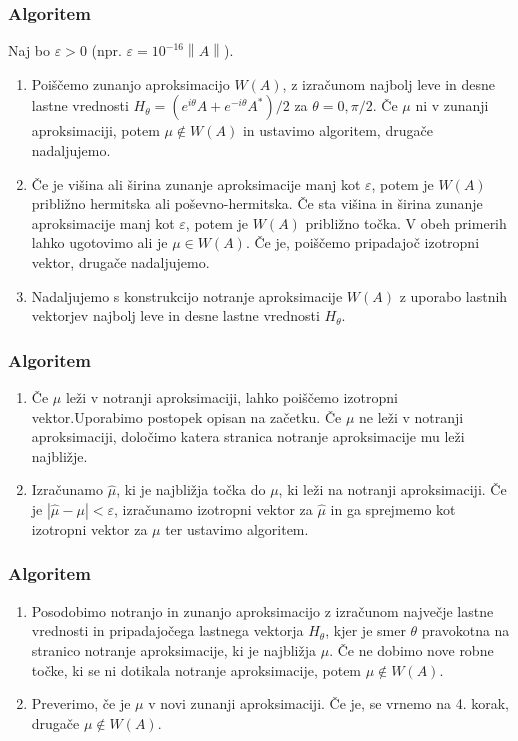 \documentclass{beamer}
\newcommand{\abs}[1]{ \left\lvert#1\right\rvert}
\newcommand{\norm}[1]{\left\lVert#1\right\rVert}
\newcounter{saveenumi}
\newcommand{\seti}{\setcounter{saveenumi}{\value{enumi}}}
\newcommand{\conti}{\setcounter{enumi}{\value{saveenumi}}}
\begin{document}
\begin{frame}
\frametitle{Algoritem}
Naj bo $\varepsilon >0$ (npr. $\varepsilon=10^{-16}\norm{A}$). 
\begin{enumerate}[1.]
\item Poiščemo zunanjo aproksimacijo $W(A)$, z izračunom najbolj leve in desne lastne vrednosti $H_\theta =(e^{i\theta}A+e^{-i\theta}A^\ast)/2$ za $\theta =0, \pi/2$. %
Če $\mu$ ni v zunanji aproksimaciji, potem $\mu \not \in W(A)$ in ustavimo algoritem, drugače nadaljujemo.\medskip
\item Če je višina ali širina zunanje aproksimacije manj kot $\varepsilon$, potem je $W(A)$ približno hermitska ali poševno-hermitska. Če sta višina in širina zunanje aproksimacije manj kot $\varepsilon$, potem je $W(A)$ približno točka. V obeh primerih lahko ugotovimo ali je $\mu \in W(A)$. Če je, poiščemo pripadajoč izotropni vektor, drugače nadaljujemo.
\item Nadaljujemo s konstrukcijo notranje aproksimacije $W(A)$ z uporabo lastnih vektorjev najbolj leve in desne lastne vrednosti $H_{\theta}$.%

\seti
\end{enumerate}
\end{frame}
\begin{frame}
\frametitle{Algoritem}
\begin{enumerate}[1.]
\conti
\item  Če $\mu$ leži v notranji aproksimaciji, lahko poiščemo izotropni vektor.Uporabimo postopek opisan na začetku. %
Če $\mu$ ne leži v notranji aproksimaciji, določimo katera stranica notranje aproksimacije mu leži najbližje.\medskip
\item  Izračunamo $\hat{\mu}$, ki je najbližja točka do $\mu$, ki leži na notranji aproksimaciji. Če je $\abs{\hat{\mu}-\mu}<\varepsilon$, izračunamo izotropni vektor za $\hat{\mu}$ in ga sprejmemo kot izotropni vektor za $\mu$ ter ustavimo algoritem.
\seti
\end{enumerate}
\end{frame}
\begin{frame}
\frametitle{Algoritem}
\begin{enumerate}[1.]
\conti
\item Posodobimo notranjo in zunanjo aproksimacijo z izračunom največje lastne vrednosti in pripadajočega lastnega vektorja $H_{\theta}$, kjer je smer $\theta$ pravokotna na stranico notranje aproksimacije, ki je najbližja $\mu$. Če ne dobimo nove robne točke, ki se ni dotikala notranje aproksimacije, potem $\mu \not \in W(A)$. \medskip
\item Preverimo, če je $\mu$  v novi zunanji aproksimaciji. Če je, se vrnemo na 4. korak, drugače $\mu \not \in W(A)$. 
\end{enumerate}
\end{frame}
\end{document}
